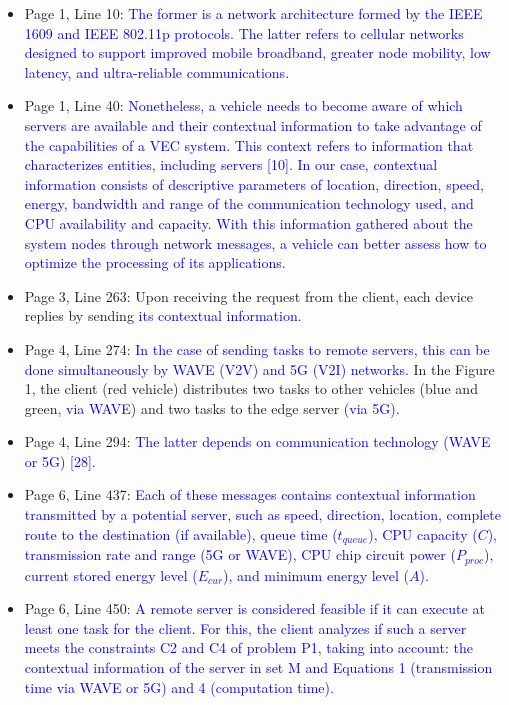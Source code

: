 \begin{itemize}
    \item Page 1, Line 10: \textcolor{blue}{The former is a network architecture formed by the IEEE 1609 and IEEE 802.11p protocols. The latter refers to cellular networks designed to support improved mobile broadband, greater node mobility, low latency, and ultra-reliable communications.}
    \item Page 1, Line 40: \textcolor{blue}{Nonetheless, a vehicle needs to become aware of which servers are available and their contextual information to take advantage of the capabilities of a VEC system. This context refers to information that characterizes entities, including servers [10]. In our case, contextual information consists of descriptive parameters of location, direction, speed, energy, bandwidth and range of the communication technology used, and CPU availability and capacity. With this information gathered about the system nodes through network messages, a vehicle can better assess how to optimize the processing of its applications.}
    \item Page 3, Line 263: Upon receiving the request from the client, each device replies by sending \textcolor{blue}{its contextual information}.    
    \item Page 4, Line 274: \textcolor{blue}{In the case of sending tasks to remote servers, this can be done simultaneously by WAVE (V2V) and 5G (V2I) networks.} In the Figure 1, the client (red vehicle) distributes two tasks to other vehicles (blue and green, \textcolor{blue}{via WAVE}) and two tasks to the edge server \textcolor{blue}{(via 5G)}.
    \item Page 4, Line 294: \textcolor{blue}{The latter depends on communication technology (WAVE or 5G) [28].}
    \item Page 6, Line 437: \textcolor{blue}{Each of these messages contains contextual information transmitted by a potential server, such as speed, direction, location, complete route to the destination (if available), queue time ($t_{queue}$), CPU capacity ($C$), transmission rate and range (5G or WAVE), CPU chip circuit power ($P_{proc}$), current stored energy level ($E_{cur}$), and minimum energy level ($A$).}
    \item Page 6, Line 450: \textcolor{blue}{A remote server is considered feasible if it can execute at least one task for the client. For this, the client analyzes if such a server meets the constraints C2 and C4 of problem P1, taking into account: the contextual information of the server in set M and Equations 1 (transmission time via WAVE or 5G) and 4 (computation time).}

\end{itemize}
